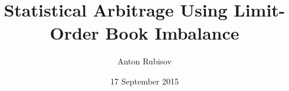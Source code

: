 \title[Arbitrage with Order Imbalance]{Statistical Arbitrage Using Limit-Order Book Imbalance}
\author{Anton Rubisov}
\date{17 September 2015}
\beamertemplatenavigationsymbolsempty

\usepackage{booktabs}
\usepackage[compatibility=false]{caption}
\usepackage{subcaption}

\DeclareMathOperator{\sgn}{\mathrm{sgn}}
\newcommand{\mat}[1]{\boldsymbol{#1}}
\newcommand{\ra}[1]{\renewcommand{\arraystretch}{#1}}